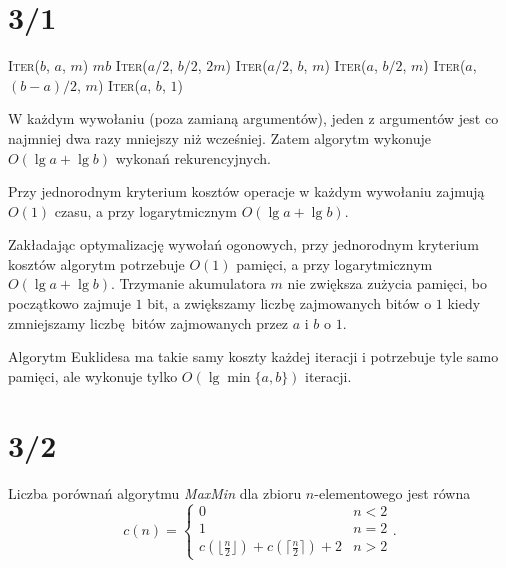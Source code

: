 \documentclass[a4paper, 12pt]{article}
\title{}
\author{Wiktor Kuchta}
\date{\vspace{-4ex}}
\newcommand{\+}{\enspace}
\begin{document}
\maketitle
\section*{3/1}
\begin{algorithm}
	\begin{algorithmic}
				\State \Return \textsc{Iter}($b$, $a$, $m$)
				\State \Return $mb$
				\State \Return \textsc{Iter}($a/2$, $b/2$, $2m$)
				\State \Return \textsc{Iter}($a/2$, $b$, $m$)
				\State \Return \textsc{Iter}($a$, $b/2$, $m$)
				\State \Return \textsc{Iter}($a$, $(b-a)/2$, $m$)
			\EndIf
			\EndProcedure
			\State \Return \textsc{Iter}($a$, $b$, $1$)
		\EndProcedure
	\end{algorithmic}
\end{algorithm}
W każdym wywołaniu (poza zamianą argumentów), jeden z argumentów
jest co najmniej dwa razy mniejszy niż wcześniej.
Zatem algorytm wykonuje $O(\lg a + \lg b)$ wykonań rekurencyjnych.

Przy jednorodnym kryterium kosztów operacje w każdym wywołaniu zajmują
$O(1)$ czasu, a przy logarytmicznym $O(\lg a + \lg b)$.

Zakładając optymalizację wywołań ogonowych,
przy jednorodnym kryterium kosztów algorytm potrzebuje $O(1)$ pamięci,
a przy logarytmicznym $O(\lg a + \lg b)$.
Trzymanie akumulatora $m$ nie zwiększa zużycia pamięci, bo początkowo
zajmuje $1$ bit, a zwiększamy liczbę zajmowanych bitów o $1$ kiedy zmniejszamy
liczbę bitów zajmowanych przez $a$ i $b$ o $1$.

Algorytm Euklidesa ma takie samy koszty każdej iteracji i potrzebuje tyle samo pamięci,
ale wykonuje tylko $O(\lg\min\{a, b\})$ iteracji.

\section*{3/2}
Liczba porównań algorytmu \textit{MaxMin} dla zbioru $n$-elementowego jest równa
$$c(n) =
\begin{cases}
	0 & n < 2 \\
	1 & n = 2 \\
	c\left(\lfloor \frac{n}{2} \rfloor\right) + c\left(\lceil \frac{n}{2} \rceil\right) + 2 & n > 2
\end{cases}.$$
\end{document}
